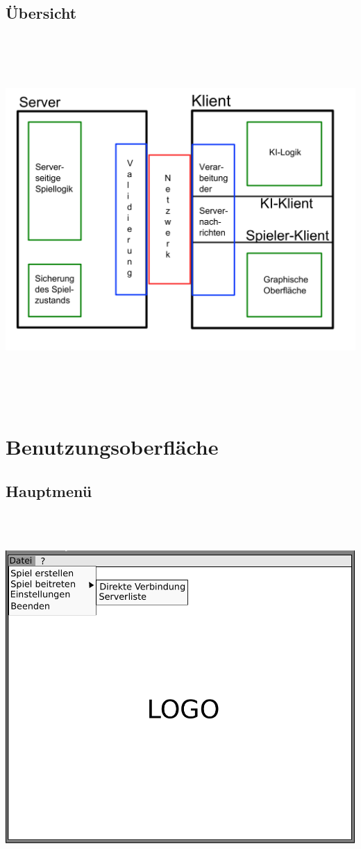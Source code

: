\documentclass[a4paper,10pt]{article}
\begin{document}
\subsection{Übersicht}
\includegraphics[height = 14cm]{systemmodell}

\section{Benutzungsoberfläche}
\subsection{Hauptmenü} 
\includegraphics[height=14cm]{hauptmenue}  
\end{document}
